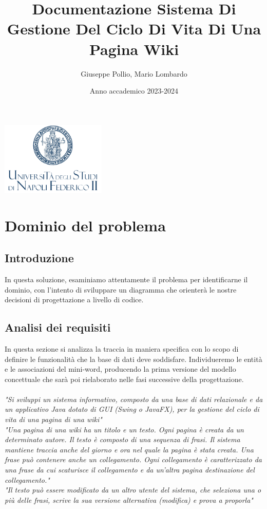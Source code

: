 \documentclass{article}
\title{Documentazione Sistema Di Gestione Del Ciclo Di Vita Di Una Pagina Wiki}
\author{Giuseppe Pollio, Mario Lombardo}
\date{Anno accademico 2023-2024}
\renewcommand{\maketitle}{%
	\begin{titlepage}
		\centering
		\includegraphics[width=5cm]{logo_uni.png}\par\vspace{1cm}
		\huge\bfseries\thetitle\par
		\vspace{1cm}
		\Large\theauthor\par
		\vfill
		\large\thedate\par
	\end{titlepage}
}
\begin{document}
	
	\maketitle
	
	\tableofcontents
	
	\newpage
	
	\section{Dominio del problema}
	\subsection{Introduzione}
	In questa soluzione, esaminiamo attentamente il problema per identificarne il dominio, con l'intento di sviluppare un diagramma che orienterà le nostre decisioni di progettazione a livello di codice.
	
		\subsection{Analisi dei requisiti}
		In questa sezione si analizza la traccia in maniera specifica con lo scopo di definire le funzionalità
		che la base di dati deve soddisfare. Individueremo le entità e le associazioni
		del mini-word, producendo la prima versione del modello concettuale che
		sarà poi rielaborato nelle fasi successive della progettazione.\\ \\
		{\itshape "Si sviluppi un sistema informativo, composto da una base di dati relazionale e da un applicativo Java dotato
			di GUI (Swing o JavaFX), per la gestione del ciclo di vita di una pagina di una wiki"}
		\vspace{0.5cm}
		\\
		{\itshape "Una pagina di una wiki ha un titolo e un testo. Ogni pagina è creata da un determinato autore. Il testo è
			composto di una sequenza di frasi. Il sistema mantiene traccia anche del giorno e ora nel quale la pagina è
			stata creata. Una frase può contenere anche un collegamento. Ogni collegamento è caratterizzato da una
			frase da cui scaturisce il collegamento e da un’altra pagina destinazione del collegamento."}
		\vspace{0.5cm}
		\\
		{\itshape "Il testo può essere modificato da un altro utente del sistema, che seleziona una o più delle frasi, scrive la sua	
			versione alternativa (modifica) e prova a proporla"}
		\vspace{0.5cm}
		
\end{document}
